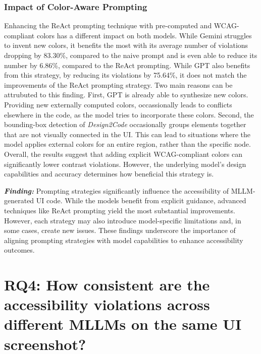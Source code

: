 \subsubsection{Impact of Color-Aware Prompting}
Enhancing the ReAct prompting technique with pre-computed 
and WCAG-compliant colors has a different impact on both models.
While Gemini struggles to invent new colors, it 
benefits the most with its average number of violations 
dropping by 83.30\%, compared to the naive prompt and 
is even able to reduce its number by 6.86\%, compared to 
the ReAct prompting. While GPT also benefits from this 
strategy, by reducing its violations by 75.64\%, it does not
match the improvements of the ReAct prompting strategy.\newline
Two main reasons can be attrubuted to this finding. First,
GPT is already able to synthesize new colors. Providing 
new externally computed colors, occassionally leads to 
conflicts elsewhere in the code, as the model tries to 
incorporate these colors. Second, the bounding-box 
detection of \textit{Design2Code} occasionally groups elements
together that are not visually connected in the UI. This 
can lead to situations where the model applies external 
colors for an entire region, rather than the specific node.
Overall, the results suggest that adding explicit WCAG-compliant 
colors can significantly lower contrast violations. However, 
the underlying model's design capabilities and accuracy 
determines how beneficial this strategy is.


\begin{center}
\begin{tcolorbox}[colback=black!5!white,colframe=black!75!black,bottom=-0.05pt,top=-0.05pt]
\textit{\textbf{Finding:}} Prompting strategies significantly 
influence the accessibility of MLLM-generated UI code. 
While the models benefit from explicit guidance, 
advanced techniques like ReAct prompting yield the most 
substantial improvements. However, each strategy may also 
introduce model-specific limitations and, in some cases, 
create new issues. These findings underscore the importance 
of aligning prompting strategies with model capabilities 
to enhance accessibility outcomes.
\end{tcolorbox}
\end{center}


\section{RQ4: How consistent are the accessibility violations across different MLLMs on the same UI screenshot?}
